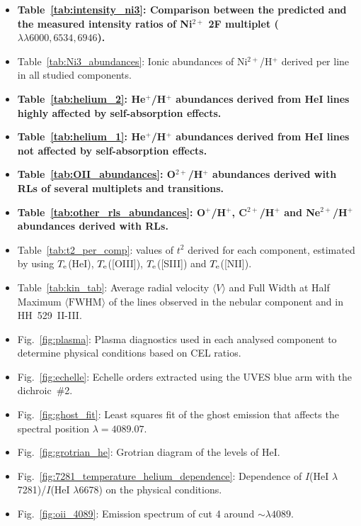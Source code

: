 \documentclass[fleqn,usenatbib]{mnras}
\begin{document}
\begin{itemize}
    
    \item {\bf Table~\ref{tab:intensity_ni3}: Comparison between the predicted and the measured intensity ratios of Ni$^{2+}$ 2F multiplet ($\lambda \lambda 6000, 6534, 6946$).}


    \item Table~\ref{tab:Ni3_abundances}: Ionic abundances of Ni$^{2+}$/H$^{+}$ derived per line in all studied components.

    \item {\bf Table~\ref{tab:helium_2}: He$^{+}$/H$^{+}$ abundances derived from He\thinspace I lines highly affected by self-absorption effects.}

    \item {\bf Table~\ref{tab:helium_1}: He$^{+}$/H$^{+}$ abundances derived from He\thinspace I lines not affected by self-absorption effects.}

    \item {\bf Table~\ref{tab:OII_abundances}: O$^{2+}$/H$^{+}$ abundances derived with RLs of several multiplets and transitions. }

    \item {\bf Table~\ref{tab:other_rls_abundances}: O$^{+}$/H$^{+}$, C$^{2+}$/H$^{+}$ and Ne$^{2+}$/H$^{+}$ abundances derived with RLs.}

    \item Table~\ref{tab:t2_per_comp}: values of $t^2$ derived for each component, estimated by using $T_{\rm e}$(He\thinspace I), $T_{\rm e}$([O\thinspace III]), $T_{\rm e}$([S\thinspace III]) and $T_{\rm e}$([N\thinspace II]).
    
    \item Table~\ref{tab:kin_tab}: Average radial velocity $\langle V \rangle$ and Full Width at Half Maximum $\langle \text{FWHM} \rangle$ of the lines observed in the nebular component and in HH~529~II-III. 
    
    \item Fig.~\ref{fig:plasma}: Plasma diagnostics used in each analysed component to determine physical conditions based on CEL ratios. 
    
    \item Fig.~\ref{fig:echelle}: Echelle orders extracted using the UVES blue arm with the dichroic~\#2.
    
    \item Fig.~\ref{fig:ghost_fit}: Least squares fit of the ghost emission that affects the spectral position $\lambda = 4089.07$.
    
    \item Fig.~\ref{fig:grotrian_he}: Grotrian diagram of the levels of He\thinspace I. 
    
    \item Fig.~\ref{fig:7281_temperature_helium_dependence}: Dependence of $I$(\mbox{He}\thinspace \mbox{I} $\lambda$7281)/$I$(\mbox{He}\thinspace \mbox{I} $\lambda$6678) on the physical conditions.
    
    \item Fig.~\ref{fig:oii_4089}: Emission spectrum of cut 4 around $\sim \lambda 4089$.
    
 \end{itemize}
\end{document}
